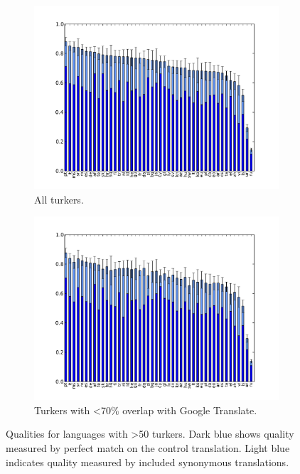 \documentclass[11pt]{article}
\begin{document}
\begin{figure}
\centering
\begin{subfigure}[b]{1\linewidth}
\includegraphics[width=\textwidth]{figures/quality-all.pdf}
\caption{All turkers.}                
\label{quality-all}
\end{subfigure}
\begin{subfigure}[b]{1\linewidth}
\includegraphics[width=\textwidth]{figures/quality-filtered.pdf}
\caption{Turkers with \textless 70\% overlap with Google Translate.}
\label{quality-filtered}
\end{subfigure}
\caption{Qualities for languages with \textgreater 50 turkers. Dark blue shows quality measured by perfect match on the control translation. Light blue indicates quality measured by included synonymous translations.}\label{qual}
\end{figure}
\end{document}
